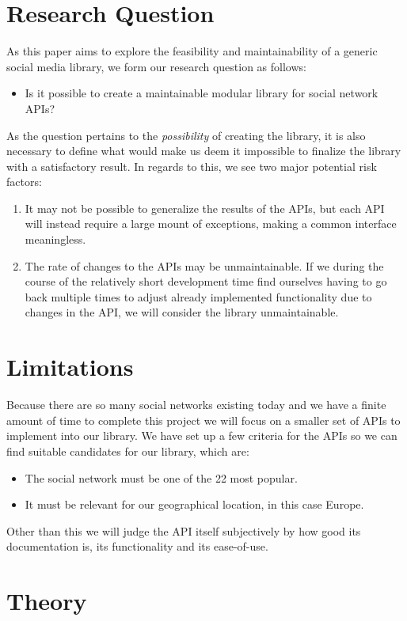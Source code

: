 \documentclass{sigchi-alternate}
\begin{document}
\section{Research Question}
As this paper aims to explore the feasibility and maintainability of a generic social media library, we form our research question as follows:

\begin{itemize}
	\item Is it possible to create a maintainable modular library for social network APIs?
\end{itemize}

As the question pertains to the \textit{possibility} of creating the library, it is also necessary to define what would make us deem it impossible to finalize
the library with a satisfactory result. In regards to this, we see two major potential risk factors:
\begin{enumerate}
	\item It may not be possible to generalize the results of the APIs, but each API will instead require a large mount of exceptions, making a common interface meaningless.
	\item The rate of changes to the APIs may be unmaintainable. If we during the course of the relatively short development time find ourselves having to go back multiple
	times to adjust already implemented functionality due to changes in the API, we will consider the library unmaintainable.
\end{enumerate}
\section{Limitations}
Because there are so many social networks existing today and we have a finite amount of time to complete this
project we will focus on a smaller set of APIs to implement into our library.  We have set up a few criteria 
for the APIs so we can find suitable candidates for our library, which are:
\begin{itemize}
	\item The social network must be one of the 22 most popular\autocite{STATISTA_LEADING_SOCIAL_NETWORKS}.
	\item It must be relevant for our geographical location, in this case Europe.
\end{itemize}
Other than this we will judge the API itself subjectively by how good its documentation is, its functionality and its ease-of-use. 

\section{Theory}
\end{document}
